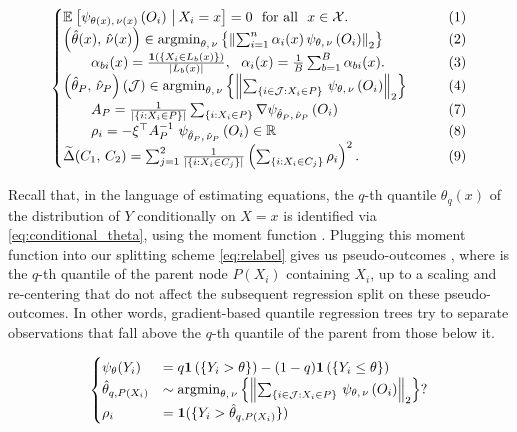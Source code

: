 \documentclass[aos]{imsart}
\theoremstyle{plain}
\theoremstyle{definition}
\theoremstyle{remark}
\begin{document}
\begin{CJK}{UTF8}{gbsn}
\begin{equation*}
\begin{cases}
\EE{\psi_{\theta(x), \, \nu(x)}\p{O_i} \cond X_i = x} = 0 \ \text{ for all } \ x \in \xx. &\qquad (1) \\
\p{\htheta(x), \, \hnu(x)} \in \argmin_{\theta, \, \nu} \cb{\Norm{\sum_{i = 1}^n \alpha_i(x) \, \psi_{\theta, \, \nu}\p{O_i}}_2} &\qquad (2) \\
\qquad  \alpha_{bi}(x) = \frac{\1\p{\cb{X_i \in L_b(x)}}}{\abs{L_b(x)}}, \ \ \alpha_i(x) = \frac{1}{B} \sum_{b = 1}^B \alpha_{bi}(x).  &\qquad (3) \\
\p{\htheta_P, \, \hnu_P}(\mathcal{J}) \in \argmin_{\theta, \, \nu} \cb{\Norm{\sum_{\cb{i\in\mathcal{J} : X_i \in P}} \, \psi_{\theta, \, \nu}\p{O_i}}_2}   &\qquad (4) \\
\qquad A_P = \frac{1}{\abs{\cb{i : X_i \in P}}} \sum_{\cb{i : X_i \in P}} \nabla \psi_{\htheta_P, \, \hnu_P}\p{O_i} &\qquad (7) \\
\qquad  \rho_i = -\xi^\top A_P^{-1} \ \psi_{\htheta_P, \, \hnu_P}\p{O_i} \in \RR &\qquad (8) \\
\tDelta(C_1, \, C_2) =  \sum_{j = 1}^2\frac{1}{\abs{\cb{i : X_i \in C_j}}}\p{ \sum_{\cb{i : X_i \in C_j}} \rho_i}^2. &\qquad (9)
\end{cases}
\end{equation*}

Recall that, in the language of estimating equations, the $q$-th quantile $\theta_q(x)$ of the distribution of $Y$ conditionally on $X = x$ is identified via \eqref{eq:conditional_theta}, using the moment function . Plugging this moment function into our splitting scheme \eqref{eq:relabel} gives us pseudo-outcomes , where  is the $q$-th quantile of the parent node $P(X_i)$ containing $X_i$, up to a scaling and re-centering that do not affect the subsequent regression split on these pseudo-outcomes.
In other words, gradient-based quantile regression trees try to separate observations that fall above the $q$-th quantile of the parent from those below it.

\begin{equation*}
\begin{cases}
\psi_{\theta}(Y_i) &= q \1\p{\cb{Y_i > \theta}} - (1 - q) \1\p{\cb{Y_i \leq \theta}} \\
\htheta_{q, P(X_i)} &\sim \argmin_{\theta, \, \nu} \cb{\Norm{\sum_{\cb{i\in\mathcal{J} : X_i \in P}} \, \psi_{\theta, \, \nu}\p{O_i}}_2} ? \\
\rho_i &= \1(\{Y_i > \htheta_{q, P(X_i)}\})
\end{cases}
\end{equation*}


\end{CJK}
\end{document}
